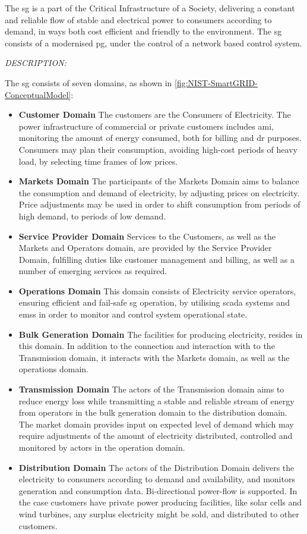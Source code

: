 The \acrshort{sg} is a part of the Critical Infrastructure of a Society, delivering a constant and reliable flow of stable and electrical power to consumers according to demand, in ways both cost efficient and friendly to the environment. The \acrshort{sg} consists of a modernised \acrshort{pg}, under the control of a network based control system. 


\textit{DESCRIPTION:}
\textbf{\cite{kumar2015monitoring}  }


The \acrshort{sg} consists of seven domains, as shown in \figureautorefname { }\ref{fig:NIST-SmartGRID-ConceptualModel}:
\begin{itemize}
    \item \textbf{Customer Domain} The customers are the Consumers of Electricity.
    The power infrastructure of commercial or private customers includes \acrfull{ami}, monitoring the amount of energy consumed, both for billing and \acrfull{dr} purposes. Consumers may plan their consumption, avoiding high-cost periods of heavy load, by  selecting time frames of low prices.
    \item \textbf{Markets Domain} The participants of the Markets Domain aims to balance the consumption and demand of electricity, by adjusting prices on electricity. Price adjustments may be used in order to shift consumption from periods of high demand, to periods of low demand.     
    \item \textbf{Service Provider Domain} Services to the Customers,  as well as the Markets and Operators domain, are provided by the Service Provider Domain, fulfilling duties like customer management and billing, as well as a number of emerging services as required. 
    \item \textbf{Operations Domain} This domain consists of Electricity service operators, ensuring efficient and fail-safe \acrfull{sg} operation, by utilising \acrshort{scada} systems and \acrlong{ems}s in order to monitor and control system operational state.  
    \item \textbf{Bulk Generation Domain} The facilities for producing electricity, resides in this domain. In addition to the connection and interaction with  to the Transmission domain, it interacts with the Markets domain, as well as the operations domain.  
    \item \textbf{Transmission Domain} The actors of the Transmission domain aims to reduce energy loss while transmitting a stable and reliable stream of energy from operators in the bulk generation domain to the distribution domain. The market domain provides input on expected level of demand which may require adjustments of the amount of electricity distributed, controlled and monitored by actors in the operation domain.  
    \item \textbf{Distribution Domain} The actors of the Distribution Domain delivers the electricity to consumers according to demand and availability, and monitors generation and consumption data. Bi-directional power-flow is supported. In the case customers have private  power producing facilities, like solar cells and wind turbines, any surplus electricity might be sold, and distributed to other customers.
\end{itemize}
